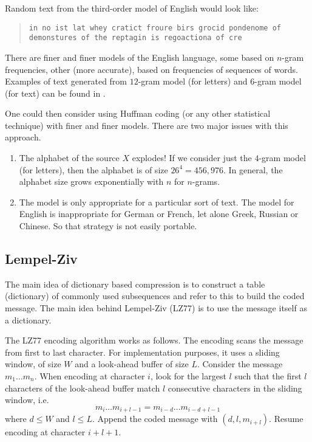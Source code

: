 \documentclass[a4paper, 11pt, openany]{book}
\begin{document}
Random text from the third-order model of English would look like:
\begin{quote}
\texttt{in no ist lat whey cratict froure birs grocid pondenome of demonstures of the reptagin is regoactiona of cre}
\end{quote}
There are finer and finer models of the English language, some based on $n$-gram frequencies, other (more accurate), based on frequencies of sequences of words. Examples of text generated from $12$-gram model (for letters) and $6$-gram model (for text) can be found in \cite[Chapter 4]{BCW90}.

One could then consider using Huffman coding (or any other statistical technique) with finer and finer models. There are two major issues with this approach.
\begin{enumerate}
    \item The alphabet of the source $X$ explodes! If we consider just the $4$-gram model (for letters), then the alphabet is of size $26^4 = 456,976$. In general, the alphabet size grows exponentially with $n$ for $n$-grams.

    \item The model is only appropriate for a particular sort of text. The model for English is inappropriate for German or French, let alone Greek, Russian or Chinese. So that strategy is not easily portable.
\end{enumerate}



\subsection{Lempel-Ziv}

The main idea of dictionary based compression is to construct a table (dictionary) of commonly used subsequences and refer to this to build the coded message. The main idea behind Lempel-Ziv (LZ77) is to use the message itself as a dictionary.

The LZ77 encoding algorithm works as follows. The encoding scans the message from first to last character. For implementation purposes, it uses a sliding window, of size $W$ and a look-ahead buffer of size $L$. Consider the message $m_1 \dots m_n$. When encoding at character $i$, look for the largest $l$ such that the first $l$ characters of the look-ahead buffer match $l$ consecutive characters in the sliding window, i.e.
\[
    m_i \dots m_{i+l-1} = m_{i-d} \dots m_{i-d+l-1}
\]
where   $d \le W$ and $l \le L$. Append the coded message with $(d,l,m_{i+l})$. Resume encoding at character $i+l+1$.
\end{document}
